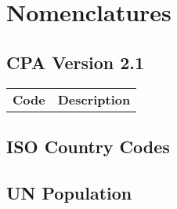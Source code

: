 \chapter{Nomenclatures}

\pagebreak
\section{CPA Version 2.1}

\begin{tabular}{l|c}%
    \bfseries Code & \bfseries Description%
\end{tabular}

\pagebreak
\section{ISO Country Codes}


\pagebreak
\section{UN Population}\label{app:unpop}

